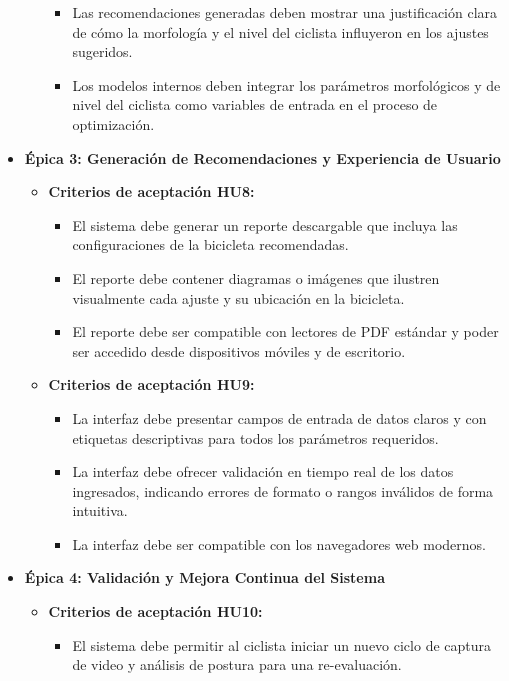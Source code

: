 \documentclass[
11pt, %
]{charter}
\begin{document}
\begin{itemize}
\begin{itemize}
\begin{itemize}
          \item Las recomendaciones generadas deben mostrar una justificación clara de cómo la morfología y el nivel del ciclista influyeron en los ajustes sugeridos.
          \item Los modelos internos deben integrar los parámetros morfológicos y de nivel del ciclista como variables de entrada en el proceso de optimización.
        \end{itemize}
    \end{itemize}
  \item \textbf{Épica 3: Generación de Recomendaciones y Experiencia de Usuario}
    \begin{itemize}
      \item \textbf{Criterios de aceptación HU8:} 
        \begin{itemize}
          \item El sistema debe generar un reporte descargable que incluya las configuraciones de la bicicleta recomendadas. 
          \item El reporte debe contener diagramas o imágenes que ilustren visualmente cada ajuste y su ubicación en la bicicleta.
          \item El reporte debe ser compatible con lectores de PDF estándar y poder ser accedido desde dispositivos móviles y de escritorio.
        \end{itemize}
      \item \textbf{Criterios de aceptación HU9:}
        \begin{itemize}
          \item La interfaz debe presentar campos de entrada de datos claros y con etiquetas descriptivas para todos los parámetros requeridos.
          \item La interfaz debe ofrecer validación en tiempo real de los datos ingresados, indicando errores de formato o rangos inválidos de forma intuitiva.
          \item La interfaz debe ser compatible con los navegadores web modernos.
        \end{itemize}
    \end{itemize}
  \item \textbf{Épica 4: Validación y Mejora Continua del Sistema}
    \begin{itemize}
      \item \textbf{Criterios de aceptación HU10:}
        \begin{itemize}
          \item El sistema debe permitir al ciclista iniciar un nuevo ciclo de captura de video y análisis de postura para una re-evaluación. 

\end{itemize}
\end{itemize}
\end{itemize}
\end{document}
